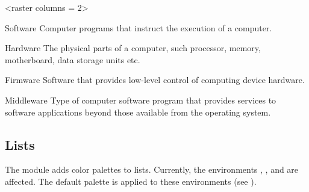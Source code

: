 \documentclass[a4paper, 11pt]{article}
\begin{document}
\begin{tcblisting}{}
    \begin{tcolorbox}[colback = black]
        \begin{PLTBoxEnumerate}
            <raster columns = 2>
            \item[Software] Computer programs that instruct the execution of a computer.
            \item[Hardware] The physical parts of a computer, such processor, memory, motherboard, data storage units etc.
            \item[Firmware] Software that provides low-level control of computing device hardware.
            \item[Middleware] Type of computer software program that provides services to software applications beyond those available from the operating system.
        \end{PLTBoxEnumerate}
    \end{tcolorbox}
\end{tcblisting}

\subsection{Lists}\label{sec:itemizer}

The module  adds color palettes to lists. Currently, the environments , , and  are affected. The default palette is applied to these environments (see ).
\end{document}
